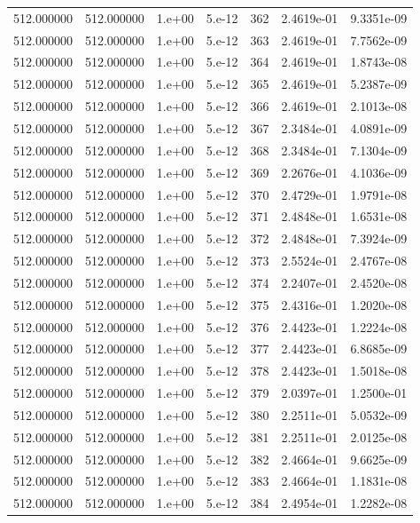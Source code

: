 \begin{table}[htbp]
\begin{tabular}{rrrrrrr}
512.000000 & 512.000000 & 1.e+00 & 5.e-12 & 362 & 2.4619e-01 & 9.3351e-09 \\
512.000000 & 512.000000 & 1.e+00 & 5.e-12 & 363 & 2.4619e-01 & 7.7562e-09 \\
512.000000 & 512.000000 & 1.e+00 & 5.e-12 & 364 & 2.4619e-01 & 1.8743e-08 \\
512.000000 & 512.000000 & 1.e+00 & 5.e-12 & 365 & 2.4619e-01 & 5.2387e-09 \\
512.000000 & 512.000000 & 1.e+00 & 5.e-12 & 366 & 2.4619e-01 & 2.1013e-08 \\
512.000000 & 512.000000 & 1.e+00 & 5.e-12 & 367 & 2.3484e-01 & 4.0891e-09 \\
512.000000 & 512.000000 & 1.e+00 & 5.e-12 & 368 & 2.3484e-01 & 7.1304e-09 \\
512.000000 & 512.000000 & 1.e+00 & 5.e-12 & 369 & 2.2676e-01 & 4.1036e-09 \\
512.000000 & 512.000000 & 1.e+00 & 5.e-12 & 370 & 2.4729e-01 & 1.9791e-08 \\
512.000000 & 512.000000 & 1.e+00 & 5.e-12 & 371 & 2.4848e-01 & 1.6531e-08 \\
512.000000 & 512.000000 & 1.e+00 & 5.e-12 & 372 & 2.4848e-01 & 7.3924e-09 \\
512.000000 & 512.000000 & 1.e+00 & 5.e-12 & 373 & 2.5524e-01 & 2.4767e-08 \\
512.000000 & 512.000000 & 1.e+00 & 5.e-12 & 374 & 2.2407e-01 & 2.4520e-08 \\
512.000000 & 512.000000 & 1.e+00 & 5.e-12 & 375 & 2.4316e-01 & 1.2020e-08 \\
512.000000 & 512.000000 & 1.e+00 & 5.e-12 & 376 & 2.4423e-01 & 1.2224e-08 \\
512.000000 & 512.000000 & 1.e+00 & 5.e-12 & 377 & 2.4423e-01 & 6.8685e-09 \\
512.000000 & 512.000000 & 1.e+00 & 5.e-12 & 378 & 2.4423e-01 & 1.5018e-08 \\
512.000000 & 512.000000 & 1.e+00 & 5.e-12 & 379 & 2.0397e-01 & 1.2500e-01 \\
512.000000 & 512.000000 & 1.e+00 & 5.e-12 & 380 & 2.2511e-01 & 5.0532e-09 \\
512.000000 & 512.000000 & 1.e+00 & 5.e-12 & 381 & 2.2511e-01 & 2.0125e-08 \\
512.000000 & 512.000000 & 1.e+00 & 5.e-12 & 382 & 2.4664e-01 & 9.6625e-09 \\
512.000000 & 512.000000 & 1.e+00 & 5.e-12 & 383 & 2.4664e-01 & 1.1831e-08 \\
512.000000 & 512.000000 & 1.e+00 & 5.e-12 & 384 & 2.4954e-01 & 1.2282e-08 \\

\end{tabular}
\end{table}
